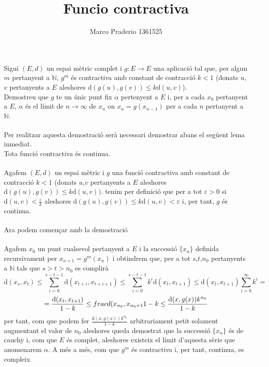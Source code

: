 \documentclass[a4paper,10pt]{article}
\title{Funcio contractiva}
\author{Marco Praderio 1361525}
\date{}
\renewcommand{\*}{\cdot}
\newcommand{\N}{\mathbb{N}}
\renewcommand{\d}{\text{d}}
\renewcommand{\a}{\alpha}
\newcommand{\e}{\varepsilon}
\begin{document}
\maketitle
Sigui $(E,d)$ un espai mètric complet i $g: E\to E$  una aplicació tal que, per algun $m$ pertanyent a $\N$, $g^m$ és contractiva amb constant de contracció $k<1$ (donats
$u$,$v$ pertanyents a $E$ aleshores $\d(g(u),g(v))\le k\d(u,v)$).\\Demostreu que $g$ te un únic punt fix $\a$ pertenyent a $E$ i, per a cada $x_0$ pertanyent a $E$, 
$\a$ és el límit de $n\to\infty$ de $x_n$ on $x_n=g(x_{n-1})$ per a cada $n$ pertanyent a $\N$.\\
\phantom{.}\\
Per realitzar aquesta demostració serà necessari demostrar abans el següent lema inmediat.\\
Tota funció contractiva és continua.\\
\phantom{.}\\
Agafem $(E,d)$ un espai mètric i $g$ una funció contractiva amb constant de contracció $k<1$ (donats $u$,$v$ pertanyents a $E$ aleshores $\d(g(u),g(v))\le k \d(u,v))$.
tenim per definició que per a tot $\e>0$ si $\d(u,v)<\frac{\e}{k}$ aleshores $\d(g(u),g(v))\le k\d(u,v)<\e$ i, per tant, $g$ és continua.\\
\phantom{.}\\
Ara podem començar amb la demostració\\
\phantom{.}\\
Agafem $x_0$ un punt cualsevol pertanyent a $E$ i la successió $\{x_n\}$ definida recursivament per $x_{n+1}=g^m(x_n)$ i obtindrem que,
per a tot $s$,$t$,$n_0$ pertanyents a $\N$ tals que $s>t>n_0$ es complirà
\begin{equation*}
\d(x_s,x_t)\le \sum_{i=0}^{s-t-1}\d(x_{t+i}, x_{t+i+1})\le\sum_{i=0}^{s-t-1}k^i\d(x_t, x_{t+1})\le\d(x_t, x_{t+1})\sum_{i=0}^{\infty}k^i=
\end{equation*}
\begin{equation*}
=\frac{\d(x_t, x_{t+1})}{1-k}\le\\frac{d(x_{n_0}, x_{n_0+1}}{1-k}\le\frac{\d(x,g(x))k^{n_0}}{1-k}
\end{equation*}
per tant, com que podem fer $\frac{\d(x,g(x))k^{n_0}}{1-k}$ arbitrariament petit solament augmentant el valor de $n_0$ aleshores queda demostrat que la successió $\{x_n\}$
és de cauchy i, com que $E$ és complet, aleshores existeix el límit d'aquesta sèrie que anomenarem $\a$. A més a més, com que $g^m$ és contractiva i, per tant, continua,
es compleix
\end{document}
